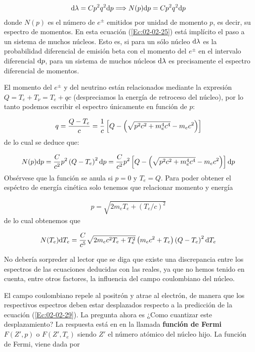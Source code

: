 \begin{eqnarray}
	\mathrm{d}\lambda = Cp^2 q^2 \mathrm{d} p \Longrightarrow N(p) \mathrm{d} p = Cp^2 q^2 \mathrm{d} p \label{Ec:02-02-25}
\end{eqnarray} 
donde $N(p)$ es el número de $e^{\pm}$ emitidos por unidad de momento $p$, es decir, su espectro de momentos. En esta ecuación (\ref{Ec:02-02-25}) está implícito el paso a un sistema de muchos núcleos. Esto es, si para un sólo núcleo $\mathrm{d} \lambda$ es la probabilidad diferencial de emisión beta con el momento del $e^\pm$ en el intervalo diferencial $\mathrm{d} p$, para un sistema de muchos núcleos $\mathrm{d} \lambda$ es precisamente el espectro diferencial de momentos.

El momento del $e^{\pm}$ y del neutrino están relacionados mediante la expresión $Q=T_e+T_\nu=T_e+qc$ (despreciamos la energía de retroceso del núcleo), por lo tanto podemos escribir el espectro únicamente en función de $p$:

\begin{eqnarray}
	q = \frac{Q-T_e}{c} = \frac{1}{c} \left[ Q- \left(  \sqrt{p^2 c^2 + m_e^4 c ^4} -m_ec^2 \right) \right]
\end{eqnarray}
de lo cual se deduce que:

\begin{eqnarray}
	N(p) \mathrm{d} p = \frac{C}{c^2} p^2 \left( Q-T_e \right)^2 \mathrm{d} p = \frac{C}{c^2} p^2 \left[ Q- \left(  \sqrt{p^2 c^2 + m_e^4 c ^4} -m_ec^2 \right)  \right] \mathrm{d} p
\end{eqnarray}
Obsérvese que la función se anula si $p=0$  y $T_e=Q$. Para poder obtener el espéctro de energía cinética solo tenemos que relacionar momento y energía

\begin{eqnarray}
	p=\sqrt{2m_eT_e+(T_e/c)^2}
\end{eqnarray}
de lo cual obtenemos que

\begin{eqnarray}
	N(T_e) \mathrm{d} T_e = \frac{C}{c^5} \sqrt{2m_e c^2 T_e + T_e^2} \left( m_e c^2 + T_e \right) \left( Q-T_e \right)^2 \mathrm{d} T_e \label{Ec:02-02-29}
\end{eqnarray}

No debería sorpreder al lector que se diga que existe una discrepancia entre los espectros de las ecuaciones deducidas con las reales, ya que no hemos tenido en cuenta, entre otros factores, la influencia del campo coulombiano del núcleo. 

El campo coulombiano repele al positrón y atrae al electrón, de manera que los respectivos espectros deben estar desplazados respecto a la predicción de la ecuación (\ref{Ec:02-02-29}). La pregunta ahora es ¿Como cuantizar este desplazamiento? La respuesta está en en la llamada \textbf{función de Fermi} $F(Z',p)$ o $F(Z',T_e)$ siendo $Z'$ el número atómico del núcleo hijo. La función de Fermi, viene dada por

